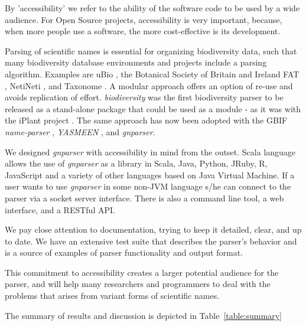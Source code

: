 \documentclass{bmcart}
\begin{document}
By 'accessibility' we refer to the ability of the software code to be used by a wide
audience. For Open Source projects, accessibility is very important, because, when more people use a software, the more cost-effective is its development.

Parsing of scientific names is essential for organizing biodiversity data, such that many biodiversity database environments and projects include a parsing algorithm.  Examples
are uBio \cite{ubio:parser}, the Botanical Society of Britain and Ireland
\cite{botsociety:parser} FAT \cite{Sautter2006}, NetiNeti \cite{Akella2012}, and Taxonome \cite{Kluyver2013}. A modular approach offers an option of re-use and avoids replication of effort. \textit{biodiversity} was the first biodiversity parser to be released as a stand-alone package that could be used as a module - as it was with the iPlant project \cite{Boyle2013}. The same approach has now been adopted with the GBIF \textit{name-parser}
\cite{gbifNameParser}, \textit{YASMEEN} \cite{VandenBerghe2015}, and
\textit{gnparser}.

We designed \textit{gnparser} with accessibility in mind from the outset. Scala
language allows the use of \textit{gnparser} as a library in Scala, Java,
Python, JRuby, R, JavaScript and a variety of other languages based on
Java Virtual Machine. If a user wants to use \textit{gnparser}  in some non-JVM
language s/he can connect to the parser via a socket server interface. There is
also a command line tool, a web interface, and a RESTful API.

We pay close attention to documentation, trying to keep it detailed, clear, and
up to date. We have an extensive test suite that describes the parser's behavior
and is a source of examples of parser functionality and output
format.

This commitment to accessibility creates a larger potential audience for the parser, and will help
many researchers and programmers to deal with the  problems that arises from variant forms of scientific names.

The summary of results and discussion is depicted in
Table~\ref{table:summary}
\end{document}

